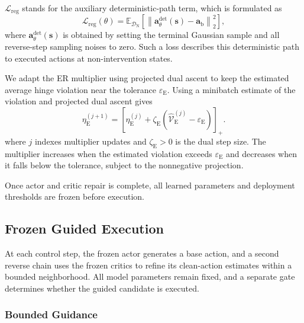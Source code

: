 \documentclass[9pt,journal]{IEEEtran}
\newcommand{\DN}{\mathcal{D}_{\mathrm{N}}}
\newcommand{\E}{\mathbb{E}}
\newcommand{\va}{\bm{a}}
\newcommand{\vs}{\bm{s}}
\newcommand{\vab}{\ensuremath{\va_{\mathrm b}}}      %
\begin{document}
$\mathcal{L}_{\mathrm{reg}}$ stands for the auxiliary deterministic-path term, which is formulated as 
\begin{equation}
    \mathcal{L}_{\mathrm{reg}}(\theta)
    =
    \E_{\DN}
    \left[
    \left\|
    \va^{\mathrm{det}}_{\theta}\!\left(\vs\right)
    -
    \vab
    \right\|_2^2
    \right],
    \label{eq:detanchor}
\end{equation}
where $\va^{\mathrm{det}}_\theta(\vs)$ is obtained by
setting the terminal Gaussian sample and all reverse-step
sampling noises to zero. Such a loss describes this deterministic
path to executed actions at non-intervention states.

We adapt the ER multiplier using projected dual ascent
to keep the estimated average hinge violation near the
tolerance $\varepsilon_{\mathrm E}$.
Using a minibatch estimate of the violation and projected dual ascent
gives
\begin{equation}
    \eta_{\mathrm{E}}^{(j+1)}
    =
    \left[
    \eta_{\mathrm{E}}^{(j)}
    +
    \zeta_{\mathrm E}
    \left(
    \widehat{\mathcal V}_{\mathrm E}^{(j)}
    -
    \varepsilon_{\mathrm E}
    \right)
    \right]_+ .
    \label{eq:dualupdate}
\end{equation}
where $j$ indexes multiplier updates and
$\zeta_{\mathrm E}>0$ is the dual step size.
The multiplier increases when the estimated violation
exceeds $\varepsilon_{\mathrm E}$ and decreases when it
falls below the tolerance, subject to the nonnegative
projection.

Once actor and critic repair is complete, all learned parameters and
deployment thresholds are frozen before execution.


\subsection{Frozen Guided Execution}
\label{sec:frozen_execution}

At each control step, the frozen actor generates a base
action, and a second reverse chain uses the frozen critics
to refine its clean-action estimates within a bounded
neighborhood. All model parameters remain fixed, and
a separate gate determines whether the guided candidate
is executed.

\subsubsection{Bounded Guidance}
\label{sec:bounded_guidance}
\end{document}

